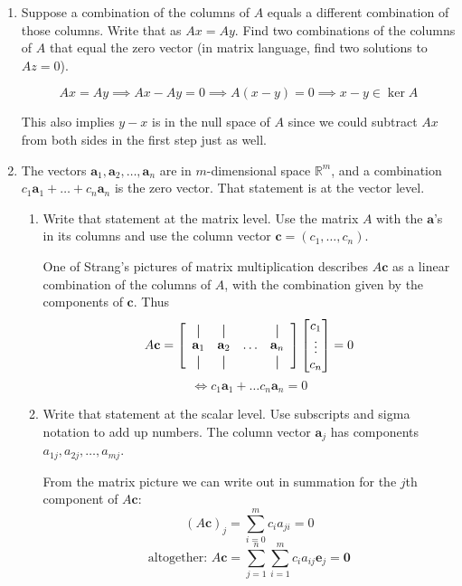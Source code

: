 \documentclass{scrartcl}
\newcommand{\R}{\mathbb{R}}
\newcommand*{\vertbar}{\rule[-1ex]{0.5pt}{2.5ex}}
\begin{document}
\begin{enumerate}
\item Suppose a combination of the columns of $A$ equals a different combination of those columns. Write that as $Ax = Ay$. Find two combinations of the columns of $A$ that equal the zero vector (in matrix language, find two solutions to $Az = 0$).

$$Ax = Ay \implies Ax - Ay = 0 \implies A(x-y) = 0 \implies x-y \in \ker A$$

This also implies $y-x$ is in the null space of $A$ since we could subtract $Ax$ from both sides in the first step just as well.

\item The vectors $\mathbf{a}_1, \mathbf{a}_2, \ldots, \mathbf{a}_n$ are in $m$-dimensional space $\R^m$, and a combination $c_1\mathbf{a}_1 + \ldots + c_n \mathbf{a}_n$ is the zero vector. That statement is at the vector level.
\begin{enumerate}
	\item Write that statement at the matrix level. Use the matrix $A$ with the $\mathbf{a}$'s in its columns and use the column vector $\mathbf{c} = (c_1, \ldots, c_n)$.

One of Strang's pictures of matrix multiplication describes $A\mathbf{c}$ as a linear combination of the columns of $A$, with the combination given by the components of $\mathbf{c}$. Thus
\[
A\mathbf{c} = 
\left[
  \begin{array}{cccc}
    \vertbar & \vertbar &        & \vertbar \\
    \mathbf{a}_{1}    & \mathbf{a}_{2}    & \ldots & \mathbf{a}_{n}    \\
    \vertbar & \vertbar &        & \vertbar 
  \end{array}
\right]\begin{bmatrix}
	c_1 \\ \vdots \\ c_n
\end{bmatrix} = 0
\]
$$\iff c_1 \mathbf{a}_1 + \ldots c_n \mathbf{a}_n = 0$$


	\item Write that statement at the scalar level. Use subscripts and sigma notation to add up numbers. The column vector $\mathbf{a}_j$ has components $a_{1j}, a_{2j}, \ldots, a_{mj}$.

From the matrix picture we can write out in summation for the $j$th component of $A\mathbf{c}$:
$$(A\mathbf{c})_j = \sum_{i=0}^m c_i a_{ji} = 0$$
$$\text{altogether: } A\mathbf{c} = \sum_{j=1}^n \sum_{i=1}^m c_i a_{ij}\mathbf{e}_j = \mathbf{0}$$
\end{enumerate}


\end{enumerate}
\end{document}
